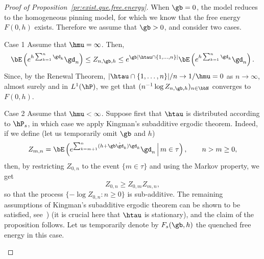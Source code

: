 \begin{proof}[Proof of Proposition~\ref{pr:exist.que.free.energy}]
When $\gb = 0$, the model reduces to the homogeneous pinning model, for which we know that the free energy $F(0,h)$ exists. Therefore we assume that $\gb > 0$, and consider two cases.

\begin{step}{Case 1}
Assume that $\hmu = \infty$. Then,
\begin{equation}
\bE \left(e^{h \sum_{k=1}^n \gd_k} \gd_n \right) \leq Z_{n,\gb,h} \leq e^{\gb|\htau \cap \{1,\ldots,n\}|} \bE \left(e^{h \sum_{k=1}^n \gd_k} \gd_n \right).
\end{equation}
Since, by the Renewal Theorem, $|\htau \cap \{1,\ldots,n\}| / n \to 1/\hmu = 0$ as $n \to \infty$, almost surely and in $L^1(\hP)$, we get that $(n^{-1} \log Z_{n,\gb,h})_{n \in \bbN}$ converges to $F(0,h)$.
\end{step}

\begin{laststep}{Case 2}
Assume that $\hmu < \infty$. Suppose first that $\htau$ is distributed according to $\hP_s$, in which case we apply Kingman's subadditive ergodic theorem. Indeed, if we define (let us temporarily omit $\gb$ and $h$)
\begin{equation}\label{eq:def_alt_part_fct}
Z_{m,n} = \bE \left(e^{\sum_{k=m+1}^n (h + \gb \hat \gd_k) \gd_k} \gd_n \,\middle|\, m \in \tau \right), \qquad n > m \geq 0,
\end{equation}
then, by restricting $Z_{0,n}$ to the event $\{m \in \tau\}$ and using the Markov property, we get
\begin{equation}\label{eq:zmn_superadd}
Z_{0,n} \geq Z_{0,m} Z_{m,n},
\end{equation}
so that the process $\{- \log Z_{0,n}: n \geq 0\}$ is sub-additive. The remaining assumptions of Kingman's subadditive ergodic theorem can be shown to be satisfied, see~\cite[Theorem~7.4.1]{Du10}) (it is crucial here that $\htau$ is stationary), and the claim of the proposition follows. Let us temporarily denote by $F_s(\gb,h)$ the quenched free energy in this case.


\end{laststep}
\end{proof}
